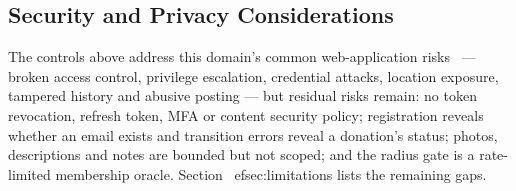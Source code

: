 \subsection{Security and Privacy Considerations}
\label{sec:security}

The controls above address this domain's common web-application
risks~\cite{owaspTop10} --- broken access control, privilege escalation,
credential attacks, location exposure, tampered history and abusive posting ---
but residual risks remain: no token revocation, refresh token, MFA or content
security policy; registration reveals whether an email exists and transition
errors reveal a donation's status; photos, descriptions and notes are bounded but
not scoped; and the radius gate is a rate-limited membership oracle.
Section~
ef{sec:limitations} lists the remaining gaps.
